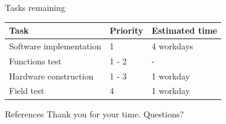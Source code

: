 \documentclass{beamer}
\begin{document}
\begin{frame}{Tasks remaining}
	\begin{tabular}{ | l | l | l |}
    \hline
    Task & Priority & Estimated time\\ \hline
    Software implementation & 1 & 4 workdays \\ \hline
    Functions test & 1 - 2 & - \\ \hline
	Hardware construction & 1 - 3 & 1 workday\\ \hline
	Field test & 4 & 1 workday\\ \hline
    \end{tabular}
\end{frame}

\begin{frame}{References}
Thank you for your time.
Questions?

{\tiny }
\end{frame}
\end{document}
